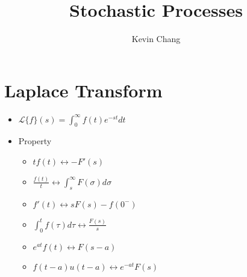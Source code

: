 \documentclass[a4paper]{article}
\title{Stochastic Processes}
\author{Kevin Chang}
\begin{document}
\maketitle

\section{Laplace Transform}
\begin{itemize}
    \item $\mathcal{L}\{f\}(s) = \int_0^\infty f(t) e^{-st} dt$
    \item Property
        \begin{itemize}
            \item $tf(t) \leftrightarrow -F'(s)$
            \item $\frac{f(t)}{t} \leftrightarrow \int_s^\infty F(\sigma) d \sigma$
            \item $f'(t) \leftrightarrow sF(s) - f(0^-)$
            \item $\int_0^t f(\tau) d\tau \leftrightarrow \frac{F(s)}{s}$
            \item $e^{at}f(t) \leftrightarrow F(s-a)$
            \item $f(t-a)u(t-a) \leftrightarrow e^{-at}F(s)$
        \end{itemize}
\end{itemize}
\end{document}

